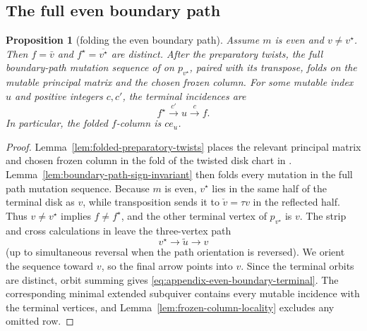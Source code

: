 \documentclass[11pt]{amsart}
\newtheorem{proposition}[theorem]{Proposition}
\theoremstyle{definition}
\theoremstyle{remark}
\begin{document}
\subsection{The full even boundary path}

\begin{proposition}[folding the even boundary path]
\label{prop:folded-even-boundary-path}
Assume $m$ is even and $v\ne v^{\star}$.  Then
$f=\bar v$ and $f^{\star}=\overline{v^{\star}}$ are distinct.  After the
preparatory twists, the full boundary-path mutation sequence of
\cite{FeiKroneckerII} on $p_{v^{\star}}$, paired with its transpose, folds
on the mutable principal matrix and the chosen frozen column.  For some
mutable index $u$ and positive integers $c,c'$, the terminal incidences are
\begin{equation}
 f^{\star}\xrightarrow{\ c'\ }u\xrightarrow{\ c\ }f.
 \label{eq:appendix-even-boundary-terminal}
\end{equation}
In particular, the folded $f$-column is $c e_u$.
\end{proposition}

\begin{proof}
Lemma~\ref{lem:folded-preparatory-twists} places the relevant principal
matrix and chosen frozen column in the fold of the twisted disk chart in \cite{FeiKroneckerII}.
Lemma~\ref{lem:boundary-path-sign-invariant} then folds every mutation in
the full path mutation sequence.  Because $m$ is even, $v^{\star}$ lies in
the same half of the terminal disk as $v$, while transposition sends it to $\check v=\tau v$ in the reflected half.
Thus $v\ne v^{\star}$ implies $f\ne f^{\star}$, and the other terminal
vertex of $p_{v^{\star}}$ is $v$.  The strip and cross calculations in
\cite[Lemmas~6.15, 6.16, and 6.18]{FeiKroneckerII} leave the three-vertex
path
\[ v^{\star}\longrightarrow\widetilde u\longrightarrow v \]
(up to simultaneous reversal when the path orientation is reversed).  We
orient the sequence toward $v$, so the final arrow points into $v$.  Since the terminal
orbits are distinct, orbit summing gives
\eqref{eq:appendix-even-boundary-terminal}.  The corresponding minimal extended
subquiver contains every mutable incidence with the terminal vertices, and
Lemma~\ref{lem:frozen-column-locality} excludes any omitted row.
\end{proof}




\end{document}
